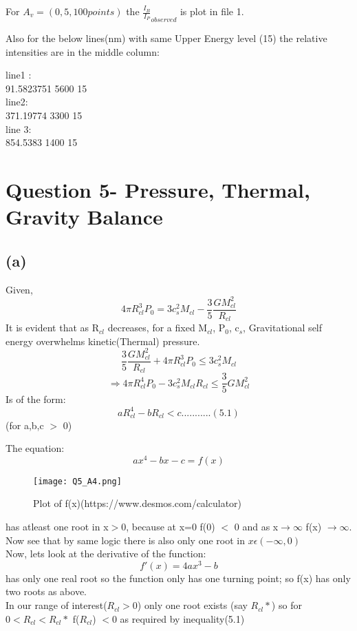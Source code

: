 \documentclass[11pt]{article}
\begin{document}
	For $A_v = (0,5, 100 points)$ the $\frac{I_B}{I_P}_{observed}$ is plot in file 1.
	
	Also for the below lines(nm) with same Upper Energy level (15) the  relative intensities are in the middle column:
	
	line1 :\\
	  91.5823751      5600		15\\
	line2:\\
	  371.19774       3300      15\\
	line 3:\\
	  854.5383       1400      15\\
	  
	\section{\color{teal}Question 5- Pressure, Thermal,  Gravity Balance}
	 \subsection{(a)}
	 Given,
	 \[
	 	4\pi R_{cl}^3 P_0 = 3c_s^2 M_{cl} - \frac{3}{5}\frac{G M_{cl}^2}{R_{cl}}
	 \]
	It is evident that as R$_{cl}$ decreases, for a fixed M$_{cl}$, P$_0$, c$_s$, Gravitational self energy overwhelms kinetic(Thermal) pressure.
	\[
		\frac{3}{5}\frac{GM_{cl}^2}{R_{cl}} + 4\pi R_{cl}^3 P_0 \leq 3c_s^2 M_{cl}
	\]
	\[
		\Rightarrow  4\pi R_{cl}^4 P_0 - 3c_s^2 M_{cl} R_{cl} \leq \frac{3}{5}GM_{cl}^2
	\]
	Is of the form:
	\[
		a R_{cl}^4 - b R_{cl} < c...........(5.1)
	\]
	(for a,b,c $>$ 0)
	
	The equation:
	\[
		ax^4 - bx - c = f(x)
	\]
	\begin{figure}[h]
		\centering\texttt{[image: Q5\_A4.png]}
		\caption{Plot of f(x)(https://www.desmos.com/calculator)} 
		\label{fig:figure1}
	\end{figure}
	
	has atleast one root in x$>$0, because at x=0 f(0) $<$ 0 and as x$\rightarrow \infty$ f(x) $\rightarrow \infty$.\\
	Now see that by same logic there is also only one root in $x \epsilon (-\infty, 0)$\\
	Now, lets look at the derivative of the function:
	\[
		f'(x) = 4ax^3 - b
	\]
	has only one real root so the function only has one turning point; so f(x) has only two roots as above.\\
	In our range of interest($R_{cl}>0$) only one root exists (say $R_{cl}*$) so for $0<R_{cl}<R_{cl}*$ f($R_{cl}$) $<0$ as required by inequality(5.1)
	
\end{document}
